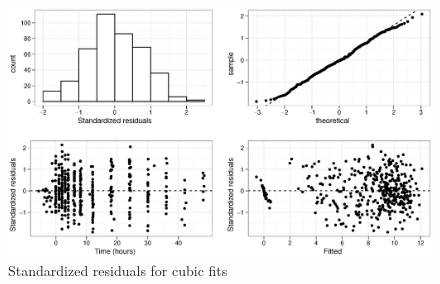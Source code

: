\begin{figure}[h]
\includegraphics[width=6.1in]{cubicsresid.eps} 
\caption{Standardized residuals for cubic fits}\label{cubicsresid}
\end{figure}
